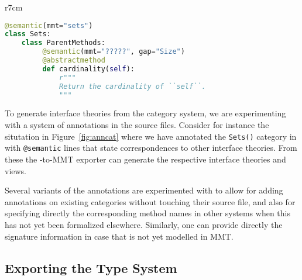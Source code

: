 \begin{wrapfigure}r{7cm}\vspace*{-2.5em}
\begin{lstlisting}[language=Python]
@semantic(mmt="sets")
class Sets:
    class ParentMethods:
         @semantic(mmt="?????", gap="Size")
         @abstractmethod
         def cardinality(self):
             r"""
             Return the cardinality of ``self``.
             """
\end{lstlisting}
\vspace*{-.5em}
\caption{An anotated Category in \Sage}\label{fig:anncat}\vspace*{-1.5em}
\end{wrapfigure}
To generate interface theories from the \Sage category system, we are experimenting with a
system of annotations in the \Sage source files. Consider for instance the situtation in
Figure~\ref{fig:anncat} where we have annotated the \texttt{Sets()} category in \Sage
with \texttt{@semantic} lines that state correspondences to other interface theories. From
these the \Sage-to-MMT exporter can generate the respective interface theories and views.

Several variants of the annotations are experimented with to allow for adding annotations on existing
categories without touching their source file, and also for specifying directly the corresponding
method names in other systems when this has not yet been formalized elsewhere. Similarly,
one can provide directly the signature information in case that is not yet modelled in
MMT.

\subsection{Exporting the \GAP Type System}

